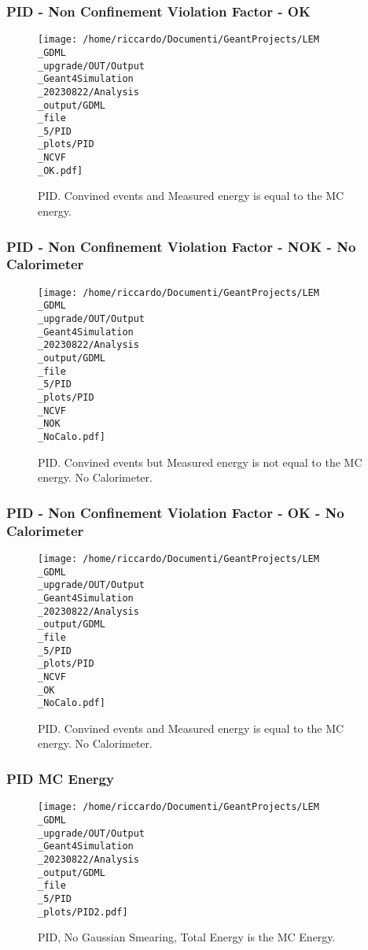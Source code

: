 \documentclass[8pt]{beamer}
\begin{document}
            \begin{frame}
                \frametitle{PID - Non Confinement Violation Factor - OK}
            
        \begin{figure}[h]
            \centering
            \texttt{[image: /home/riccardo/Documenti/GeantProjects/LEM\\\_GDML\\\_upgrade/OUT/Output\\\_Geant4Simulation\\\_20230822/Analysis\\\_output/GDML\\\_file\\\_5/PID\\\_plots/PID\\\_NCVF\\\_OK.pdf]}
            \caption{PID. Convined events and Measured energy is equal to the MC energy.}
        \end{figure}
        
            \end{frame}
            
            \begin{frame}
                \frametitle{PID - Non Confinement Violation Factor - NOK - No Calorimeter}
            
        \begin{figure}[h]
            \centering
            \texttt{[image: /home/riccardo/Documenti/GeantProjects/LEM\\\_GDML\\\_upgrade/OUT/Output\\\_Geant4Simulation\\\_20230822/Analysis\\\_output/GDML\\\_file\\\_5/PID\\\_plots/PID\\\_NCVF\\\_NOK\\\_NoCalo.pdf]}
            \caption{PID. Convined events but Measured energy is not equal to the MC energy. No Calorimeter.}
        \end{figure}
        
            \end{frame}
            
            \begin{frame}
                \frametitle{PID - Non Confinement Violation Factor - OK - No Calorimeter}
            
        \begin{figure}[h]
            \centering
            \texttt{[image: /home/riccardo/Documenti/GeantProjects/LEM\\\_GDML\\\_upgrade/OUT/Output\\\_Geant4Simulation\\\_20230822/Analysis\\\_output/GDML\\\_file\\\_5/PID\\\_plots/PID\\\_NCVF\\\_OK\\\_NoCalo.pdf]}
            \caption{PID. Convined events and Measured energy is equal to the MC energy. No Calorimeter.}
        \end{figure}
        
            \end{frame}
            
            \begin{frame}
                \frametitle{PID MC Energy}
            
        \begin{figure}[h]
            \centering
            \texttt{[image: /home/riccardo/Documenti/GeantProjects/LEM\\\_GDML\\\_upgrade/OUT/Output\\\_Geant4Simulation\\\_20230822/Analysis\\\_output/GDML\\\_file\\\_5/PID\\\_plots/PID2.pdf]}
            \caption{PID, No Gaussian Smearing, Total Energy is the MC Energy.}
        \end{figure}
        
            \end{frame}
            
\end{document}
